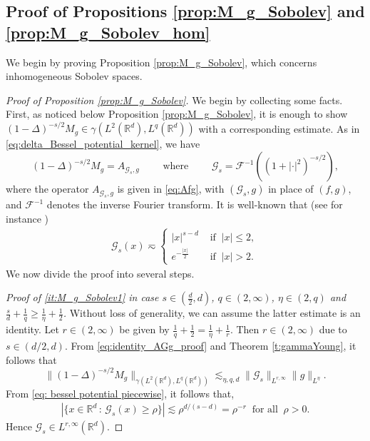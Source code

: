 \documentclass[reqno]{amsart}
\theoremstyle{plain}
\theoremstyle{remark}
\theoremstyle{plain}
\numberwithin{equation}{section}
\newcommand\cG{\mathscr{G}}
\def\R{{\mathbb R}}
\newcommand{\g}{\gamma}
\newcommand{\1}{\one}
\begin{document}
\subsection{Proof of Propositions \ref{prop:M_g_Sobolev} and \ref{prop:M_g_Sobolev_hom}}
\label{ss:proof_corollary_Mg}
We begin by proving Proposition \ref{prop:M_g_Sobolev}, which concerns inhomogeneous Sobolev spaces.

\begin{proof}[Proof of Proposition \ref{prop:M_g_Sobolev}]
We begin by collecting some facts. First, as noticed below Proposition \ref{prop:M_g_Sobolev}, it is enough to show
$(1-\Delta)^{-s/2} M_g\in\g(L^2(\R^d),L^{q}(\R^d))$ with a corresponding estimate. As in \eqref{eq:delta_Bessel_potential_kernel}, we have
\begin{equation}
\label{eq:identity_AGg_proof}
(1-\Delta)^{-s/2} M_g = A_{\mathscr{G}_s,g} \qquad \text{ where }\qquad \mathscr{G}_s=\mathscr{F}^{-1}((1+|\cdot|^2)^{-s/2}),
\end{equation}
where the operator $A_{\cG_s,g}$ is given in \eqref{eq:Afg}, with $(\cG_s,g)$ in place of $(f,g)$, and $\mathscr{F}^{-1}$ denotes the inverse Fourier transform. It is well-known that (see for instance \cite[p.16]{Grafakos2})
\begin{align}
\label{eq: bessel potential piecewise}
    \cG_s(x) \eqsim \begin{cases}
        |x|^{s-d} & \text{ if }\  |x|\leq 2,\\
        e^{-\frac{|x|}{2}} & \text{ if } \ |x|>2.
    \end{cases}
    \end{align}
We now divide the proof into several steps.

\smallskip

\emph{Proof of \eqref{it:M_g_Sobolev1} in case $
s\in(\frac{d}{2},d)$, $ q\in (2, \infty)$, $\eta\in (2, q)$ and $\frac{s}{d} + \frac{1}{q}  \geq \frac{1}{\eta} + \frac{1}{2}$.} Without loss of generality, we can assume the latter estimate is an identity. 
Let $r\in (2,\infty)$ be given by 
$\frac{1}{q}+\frac{1}{2}=\frac{1}{\eta}+\frac{1}{r}$.
Then $r\in (2, \infty)$ due to $s\in (d/2, d)$. 
%
From \eqref{eq:identity_AGg_proof} and Theorem \ref{t:gammaYoung}, it follows that 
$$
\|(1-\Delta)^{-s/2}M_g\|_{\g(L^2(\R^d),L^q(\R^d))}
\lesssim_{\eta,q,d} \|\cG_s\|_{L^{r,\infty}}\|g\|_{L^\eta}.
$$
From \eqref{eq: bessel potential piecewise}, it follows that, 
\begin{align*}
|\{x\in\R^d\,:\, \cG_s(x)\geq \rho\}|
\lesssim \rho^{d/(s-d)} = \rho^{-r} \ \text{ for all }\ \rho>0.
\end{align*}
Hence $\cG_s\in L^{r,\infty}(\R^d)$. 


\end{proof}
\end{document}
